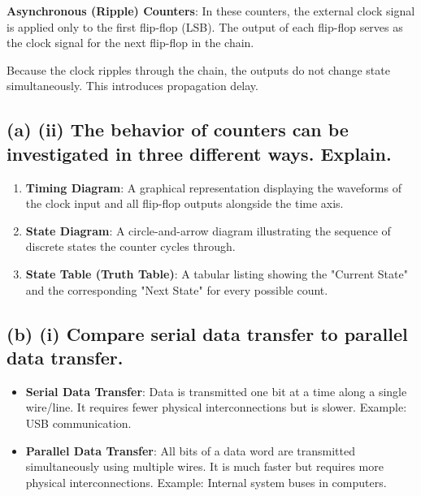 \documentclass[11pt,a4paper]{article}
\begin{document}
\textbf{Asynchronous (Ripple) Counters}: In these counters, the external clock signal is applied only to the first flip-flop (LSB). The output of each flip-flop serves as the clock signal for the next flip-flop in the chain.

\begin{center}
\end{center}

Because the clock ripples through the chain, the outputs do not change state simultaneously. This introduces propagation delay.

\subsection*{(a) (ii) The behavior of counters can be investigated in three different ways. Explain.}
\begin{enumerate}
    \item \textbf{Timing Diagram}: A graphical representation displaying the waveforms of the clock input and all flip-flop outputs alongside the time axis.
    \item \textbf{State Diagram}: A circle-and-arrow diagram illustrating the sequence of discrete states the counter cycles through.
    \item \textbf{State Table (Truth Table)}: A tabular listing showing the "Current State" and the corresponding "Next State" for every possible count.
\end{enumerate}

\subsection*{(b) (i) Compare serial data transfer to parallel data transfer.}
\begin{itemize}
    \item \textbf{Serial Data Transfer}: Data is transmitted one bit at a time along a single wire/line. It requires fewer physical interconnections but is slower. Example: USB communication.
    \item \textbf{Parallel Data Transfer}: All bits of a data word are transmitted simultaneously using multiple wires. It is much faster but requires more physical interconnections. Example: Internal system buses in computers.
\end{itemize}
\end{document}
